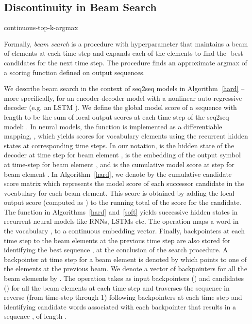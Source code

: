 \documentclass[letterpaper]{article} \usepackage{aaai18}  \usepackage{times}  \usepackage{helvet}  \usepackage{courier}  \usepackage{url}  \usepackage{graphicx}  \frenchspacing
\begin{document}
\subsection{Discontinuity in Beam Search}
\begin{algorithm*}[t]
\caption{continuous-top-k-argmax}\label{peak}
\begin{algorithmic}[1]
\Inputs{}
\State 
{} 
\State  {}
\EndFor
\end{algorithmic}
\end{algorithm*}
Formally, \textit{beam search} is a procedure with hyperparameter  that maintains a beam of  elements at each time step and expands each of the  elements to find the -best candidates for the next time step. The procedure finds an approximate argmax of a scoring function defined on output sequences.

We describe beam search in the context of seq2seq models in Algorithm~\ref{hard} -- more specifically, for an encoder-decoder \cite{sutskever2014sequence} model with a nonlinear auto-regressive decoder (e.g. an LSTM \cite{hochreiter1997long}). We define the global model score of a sequence  with length  to be the sum of local output scores at each time step of the seq2seq model: . In neural models, the function  is implemented as a differentiable mapping, , which yields scores for vocabulary elements using the recurrent hidden states at corresponding time steps. In our notation,  is the hidden state of the decoder at time step  for beam element ,  is the embedding of the output symbol at time-step  for beam element , and  is the cumulative model score at step  for beam element . In Algorithm~\ref{hard}, we denote by  the cumulative candidate score matrix which represents the model score of each successor candidate in the vocabulary for each beam element. This score is obtained by adding the local output score (computed as ) to the running total of the score for the candidate. The function  in Algorithms~\ref{hard} and~\ref{soft} yields successive hidden states in recurrent neural models like RNNs, LSTMs etc. The  operation maps a word in the vocabulary , to a continuous embedding vector. Finally, backpointers at each time step to the beam elements at the previous time step are also stored for identifying the best sequence , at the conclusion of the search procedure. A backpointer at time step  for a beam element  is denoted by  which points to one of the  elements at the previous beam. We denote a vector of backpointers for all the beam elements by . The  operation takes as input backpointers () and candidates () for all the beam elements at each time step and traverses the sequence in reverse (from time-step  through 1) following backpointers at each time step and identifying candidate words associated with each backpointer that results in a sequence , of length . 
\end{document}
